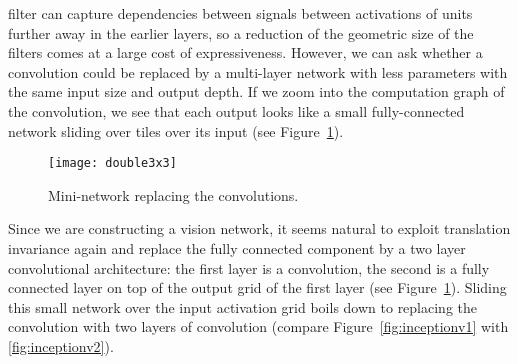 \documentclass[10pt,twocolumn,letterpaper]{article}
\begin{document}
filter can capture dependencies between signals between activations of units
further away in the earlier layers, so a reduction of the geometric size of the
filters comes at a large cost of expressiveness. However,
we can ask whether a  convolution could be
replaced by a multi-layer network with less parameters with the same input
size and output depth. If we zoom into the computation graph of the
 convolution, we see that each output looks like a small
fully-connected network sliding over  tiles over its input
(see Figure~\ref{fig:double3}).
\begin{figure}
\centering
\texttt{[image: double3x3]}
\caption{Mini-network replacing the  convolutions.}
\label{fig:double3}
\end{figure}
Since we are constructing a vision network, it seems natural to
exploit translation invariance again and replace the fully connected component
by a two layer convolutional architecture: the first layer is a 
convolution, the second is a fully connected layer on top of the 
output grid of the first layer (see Figure~\ref{fig:double3}).
Sliding this small network over the input activation grid boils down to
replacing the  convolution with two layers of 
convolution (compare Figure~\ref{fig:inceptionv1} with \ref{fig:inceptionv2}).
\end{document}
